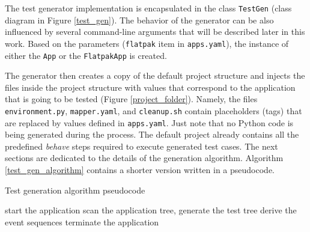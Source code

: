 The test generator implementation is encapsulated in the class \texttt{TestGen} (class diagram in Figure \ref{test_gen}). The behavior of the generator can be also influenced by several command-line arguments that will be described later in this work. Based on the parameters (\texttt{flatpak} item in \texttt{apps.yaml}), the instance of either the \texttt{App} or the \texttt{FlatpakApp} is created. 

The generator then creates a copy of the default project structure and injects the files inside the project structure with values that correspond to the application that is going to be tested (Figure \ref{project_folder}). Namely, the files \texttt{environment.py}, \texttt{mapper.yaml}, and \texttt{cleanup.sh} contain placeholders (tags) that are replaced by values defined in \texttt{apps.yaml}. Just note that no Python code is being generated during the process. The default project already contains all the predefined \textit{behave} steps required to execute generated test cases.
The next sections are dedicated to the details of the generation algorithm. Algorithm \ref{test_gen_algorithm} contains a shorter version written in a pseudocode. 

\begin{center}
\begin{algorithm}[htb!]
\caption{Test generation algorithm pseudocode}
\label{test_gen_algorithm}
\SetAlgoLined
{}
 start the application\;
 scan the application tree, generate the test tree\;
 derive the event sequences\;
 terminate the application\;
\end{algorithm}
\end{center}

